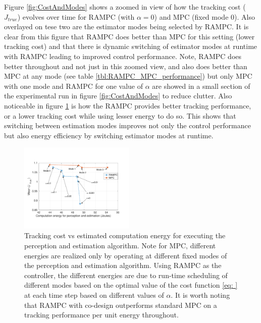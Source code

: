 Figure \ref{fig:CostAndModes} shows a zoomed in view of how the tracking cost ($J_{true}$) evolves over time for RAMPC (with $\alpha=0$) and MPC (fixed mode 0). Also overlayed on tese two are the estimator modes being selected by RAMPC. It is clear from this figure that RAMPC does better than MPC for this setting (lower tracking cost) and that there is dynamic switching of estimator modes at runtime with RAMPC leading to improved control performance. Note, RAMPC does better throughout and not just in this zoomed view, and also does better than MPC at any mode (see table \ref{tbl:RAMPC_MPC_performance}) but only MPC with one  mode and RAMPC for one value of $\alpha$ are showed in a small section of the experimental run in figure \ref{fig:CostAndModes} to reduce clutter.
Also noticeable in figure \ref{fig:TrackingVsEnergy} is how the RAMPC provides better tracking performance, or a lower tracking cost while using lesser energy to do so. This shows that switching between estimation modes improves not only the control performance but also energy efficiency by switching estimator modes at runtime. 


\begin{figure}[tbh]
	\centering
	\includegraphics[width=0.49\textwidth]{figures/TrackingVsEnergy}
	\caption{Tracking cost vs estimated computation energy for executing the perception and estimation algorithm. Note for MPC, different energies are realized only by operating at different fixed modes of the perception and estimation algorithm. Using RAMPC as the controller, the different energies are due to run-time scheduling of different modes based on the optimal value of the cost function \ref{eq: } at each time step based on different values of $\alpha$. It is worth noting that RAMPC with co-design outperforms standard MPC on a tracking performance per unit energy throughout.}
	\label{fig:TrackingVsEnergy}
\end{figure}


